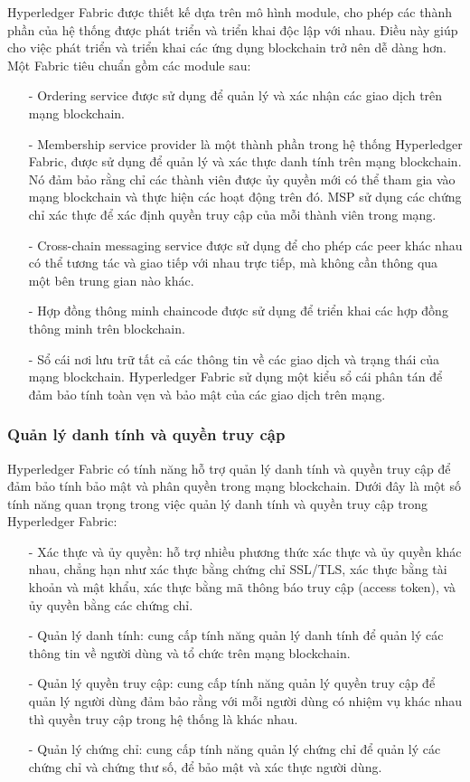 Hyperledger Fabric được thiết kế dựa trên mô hình module, cho phép các thành phần của hệ 
thống được phát triển và triển khai độc lập với nhau. Điều này giúp cho việc phát triển và 
triển khai các ứng dụng blockchain trở nên dễ dàng hơn.
Một Fabric tiêu chuẩn gồm các module sau:
\begin{itemize}
    \item[-] Ordering service được sử dụng để quản lý và xác nhận các giao dịch trên mạng blockchain.
    \item[-] Membership service provider là một thành phần trong hệ thống Hyperledger Fabric, 
    được sử dụng để quản lý và xác thực danh tính trên mạng blockchain. Nó đảm bảo rằng chỉ 
    các thành viên được ủy quyền mới có thể tham gia vào mạng blockchain và thực hiện các 
    hoạt động trên đó. MSP sử dụng các chứng chỉ xác thực để xác định quyền truy cập của mỗi thành viên trong mạng.
    \item[-] Cross-chain messaging service được sử dụng để cho phép các peer khác nhau có thể 
    tương tác và giao tiếp với nhau trực tiếp, mà không cần thông qua một bên trung gian nào khác.
    \item[-] Hợp đồng thông minh chaincode được sử dụng để triển khai các hợp đồng thông minh trên blockchain.
    \item[-] Sổ cái nơi lưu trữ tất cả các thông tin về các giao dịch và trạng thái của mạng blockchain. 
    Hyperledger Fabric sử dụng một kiểu sổ cái phân tán để đảm bảo tính toàn vẹn và bảo mật của các giao dịch trên mạng. 
    
\end{itemize}

\subsubsection{Quản lý danh tính và quyền truy cập}
Hyperledger Fabric có tính năng hỗ trợ quản lý danh tính và quyền truy cập để đảm bảo 
tính bảo mật và phân quyền trong mạng blockchain. Dưới đây là một số tính năng quan trọng 
trong việc quản lý danh tính và quyền truy cập trong Hyperledger Fabric:

\begin{itemize}
    \item[-] Xác thực và ủy quyền: hỗ trợ nhiều phương thức xác thực và ủy quyền khác nhau, 
    chẳng hạn như xác thực bằng chứng chỉ SSL/TLS, xác thực bằng tài khoản và mật khẩu, 
    xác thực bằng mã thông báo truy cập (access token), và ủy quyền bằng các chứng chỉ.
    \item[-] Quản lý danh tính: cung cấp tính năng quản lý danh tính để quản lý các thông tin
    về người dùng và tổ chức trên mạng blockchain.
    \item[-] Quản lý quyền truy cập: cung cấp tính năng quản lý quyền truy cập để quản lý 
    người dùng đảm bảo rằng với mỗi người dùng có nhiệm vụ khác nhau thì quyền truy cập trong
    hệ thống là khác nhau.
    \item[-] Quản lý chứng chỉ: cung cấp tính năng quản lý chứng chỉ để quản lý các chứng chỉ
    và chứng thư số, để bảo mật và xác thực người dùng. 

\end{itemize}
